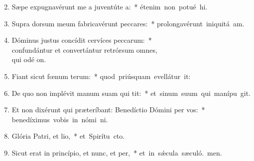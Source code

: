 \begin{flushleft}
\begin{enumerate}[leftmargin=*]
\setcounter{enumi}{1}

\item Sæpe expugnavérunt me a juventúte a:~* \mbox{étenim non potué hi.}
\item Supra dorsum meum fabricavérunt peccares:~* \mbox{prolongavérunt iniquitá am.}
\item Dóminus justus concídit cervíces peccarum:~* \\confundántur et convertántur retrórsum omnes, \\qui odé on.
\item Fiant sicut fœnum terum:~* \mbox{quod priúsquam evellátur it:}
\item De quo non implévit manum suam qui tit:~* \mbox{et sinum suum qui manípu git.}
\item Et non dixérunt qui præteríbant: Benedíctio Dómini per vos:~* \mbox{benedíximus vobis in nómi ni.}
\item Glória Patri, et lio,~* \mbox{et Spirítu cto.}
\item Sicut erat in princípio, et nunc, et per,~* \mbox{et in s\'{\ae}cula sæculó. men.}

\end{enumerate}
\end{flushleft}

